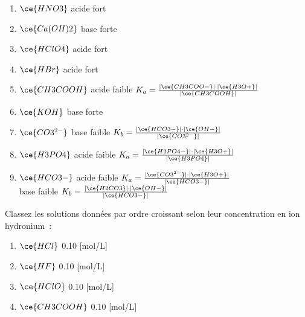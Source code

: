 \documentclass[
  11pt,
  french,
  a4paper,
  openany]{book}
\providecommand{\tightlist}{%
  \setlength{\itemsep}{0pt}\setlength{\parskip}{0pt}}
\begin{document}
\begin{Answer}

\begin{enumerate}
\def\labelenumi{\alph{enumi}.}
\tightlist
\item
  \(\ce{HNO3}\) \tabto{8em} acide fort
  \vspace{1em}
\item
  \(\ce{Ca(OH)2}\) \tabto{8em} base forte
  \vspace{1em}
\item
  \(\ce{HClO4}\) \tabto{8em} acide fort
  \vspace{1em}
\item
  \(\ce{HBr}\) \tabto{8em} acide fort
  \vspace{1em}
\item
  \(\ce{CH3COOH}\) \tabto{8em} acide faible \tabto{16em} \(K_a = \frac{|\ce{CH3COO-}| \cdot |\ce{H3O+}|}{|\ce{CH3COOH}|}\)
  \vspace{1em}
\item
  \(\ce{KOH}\) \tabto{8em} base forte
  \vspace{1em}
\item
  \(\ce{CO3^{2-}}\) \tabto{8em} base faible \tabto{16em} \(K_b = \frac{|\ce{HCO3-}| \cdot |\ce{OH-}|}{|\ce{CO3^{2-}}|}\)
  \vspace{1em}
\item
  \(\ce{H3PO4}\) \tabto{8em} acide faible \tabto{16em} \(K_a = \frac{|\ce{H2PO4-}| \cdot |\ce{H3O+}|}{|\ce{H3PO4}|}\)
  \vspace{1em}
\item
  \(\ce{HCO3-}\) \tabto{8em} acide faible \tabto{16em} \(K_a = \frac{|\ce{CO3^{2-}}| \cdot |\ce{H3O+}|}{|\ce{HCO3-}|}\)\\
  \vspace{1em}
  \tabto{8em} base faible \tabto{16em} \(K_b = \frac{|\ce{H2CO3}| \cdot |\ce{OH-}|}{|\ce{HCO3-}|}\)
\end{enumerate}


\end{Answer}

\begin{Exercise}

Classez les solutions données par ordre croissant selon leur concentration en ion hydronium~:

\begin{enumerate}
\def\labelenumi{\alph{enumi}.}
\tightlist
\item
  \(\ce{HCl}\) 0.10 {[}mol/L{]}
\item
  \(\ce{HF}\) 0.10 {[}mol/L{]}
\item
  \(\ce{HClO}\) 0.10 {[}mol/L{]}
\item
  \(\ce{CH3COOH}\) 0.10 {[}mol/L{]}
\end{enumerate}


\end{Exercise}
\end{document}
